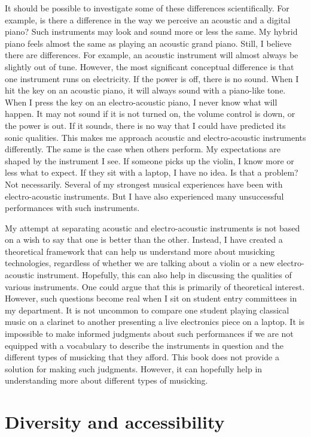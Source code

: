 It should be possible to investigate some of these differences scientifically. For example, is there a difference in the way we perceive an acoustic and a digital piano? Such instruments may look and sound more or less the same. My hybrid piano feels almost the same as playing an acoustic grand piano. Still, I believe there are differences. For example, an acoustic instrument will almost always be slightly out of tune. However, the most significant conceptual difference is that one instrument runs on electricity. If the power is off, there is no sound. When I hit the key on an acoustic piano, it will always sound with a piano-like tone. When I press the key on an electro-acoustic piano, I never know what will happen. It may not sound if it is not turned on, the volume control is down, or the power is out. If it sounds, there is no way that I could have predicted its sonic qualities. This makes me approach acoustic and electro-acoustic instruments differently. The same is the case when others perform. My expectations are shaped by the instrument I see. If someone picks up the violin, I know more or less what to expect. If they sit with a laptop, I have no idea. Is that a problem? Not necessarily. Several of my strongest musical experiences have been with electro-acoustic instruments. But I have also experienced many unsuccessful performances with such instruments.

My attempt at separating acoustic and electro-acoustic instruments is not based on a wish to say that one is better than the other. Instead, I have created a theoretical framework that can help us understand more about musicking technologies, regardless of whether we are talking about a violin or a new electro-acoustic instrument. Hopefully, this can also help in discussing the qualities of various instruments. One could argue that this is primarily of theoretical interest. However, such questions become real when I sit on student entry committees in my department. It is not uncommon to compare one student playing classical music on a clarinet to another presenting a live electronics piece on a laptop. It is impossible to make informed judgments about such performances if we are not equipped with a vocabulary to describe the instruments in question and the different types of musicking that they afford. This book does not provide a solution for making such judgments. However, it can hopefully help in understanding more about different types of musicking.


\section{Diversity and accessibility}

